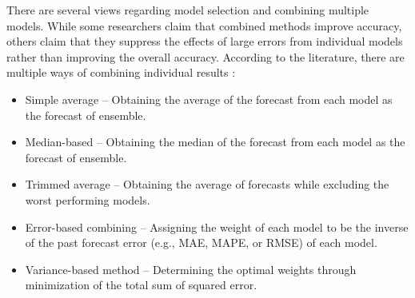 There are several views regarding model selection and combining multiple models. While some researchers claim that combined methods improve accuracy, others claim that they suppress the effects of large errors from individual models rather than improving the overall accuracy. According to the literature, there are multiple ways of combining individual results \cite{Adhikari_2012}:

\begin{itemize}
\item Simple average -- Obtaining the average of the forecast from each model as the forecast of ensemble.
\item Median-based -- Obtaining the median of the forecast from each model as the forecast of ensemble.
\item Trimmed average -- Obtaining the average of forecasts while excluding the worst performing models.
\item Error-based combining -- Assigning the weight of each model to be the inverse of the past forecast error (e.g., MAE, MAPE, or RMSE) of each model.
\item Variance-based method -- Determining the optimal weights through minimization of the total sum of squared error.
\end{itemize}